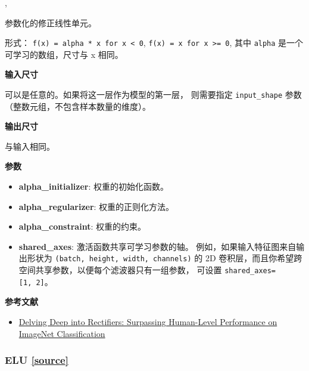 \begin{Shaded}
\begin{Highlighting}[]
\OperatorTok{=}\OperatorTok{=}, \\
\hspace{3cm}\OperatorTok{=}\OperatorTok{=}\NormalTok{)}
\end{Highlighting}
\end{Shaded}

参数化的修正线性单元。

形式： \texttt{f(x)\ =\ alpha\ *\ x\ for\ x\ \textless{}\ 0},
\texttt{f(x)\ =\ x\ for\ x\ \textgreater{}=\ 0}, 其中 \texttt{alpha}
是一个可学习的数组，尺寸与 x 相同。

\textbf{输入尺寸}

可以是任意的。如果将这一层作为模型的第一层， 则需要指定
\texttt{input\_shape} 参数 （整数元组，不包含样本数量的维度）。

\textbf{输出尺寸}

与输入相同。

\textbf{参数}

\begin{itemize}
\tightlist
\item
  \textbf{alpha\_initializer}: 权重的初始化函数。
\item
  \textbf{alpha\_regularizer}: 权重的正则化方法。
\item
  \textbf{alpha\_constraint}: 权重的约束。
\item
  \textbf{shared\_axes}: 激活函数共享可学习参数的轴。
  例如，如果输入特征图来自输出形状为
  \texttt{(batch,\ height,\ width,\ channels)} 的 2D
  卷积层，而且你希望跨空间共享参数，以便每个滤波器只有一组参数， 可设置
  \texttt{shared\_axes={[}1,\ 2{]}}。
\end{itemize}

\textbf{参考文献}

\begin{itemize}
\tightlist
\item
  \href{https://arxiv.org/abs/1502.01852}{Delving Deep into Rectifiers:
  Surpassing Human-Level Performance on ImageNet Classification}
\end{itemize}




\subsubsection{ELU {\href{https://github.com/keras-team/keras/blob/master/keras/layers/advanced_activations.py\#L152}{{[}source{]}}}}

